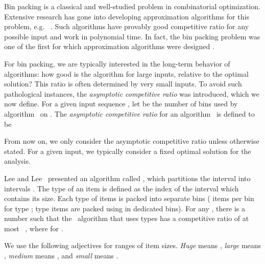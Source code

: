 Bin packing is a classical and well-studied problem in combinatorial optimization. 
Extensive research has gone into developing approximation
algorithms for this problem, e.g. ~\cite{CoGaJo97,GaGrUl72,FerLue81,KarKar82,Rothvoss13,GoeRot14}. Such algorithms have provably good competitive ratio for any possible
input and work in polynomial time. In fact, the bin packing problem was one 
of the first for which approximation algorithms were designed \cite{Johnso73}. 

For bin packing, we are typically interested in the long-term behavior of
algorithms: how good is the algorithm for large inputs, relative to the optimal solution? 
This ratio is often determined by very small inputs. 
To avoid such pathological
instances, the {\em asymptotic competitive ratio} was introduced,
which we now define. For a given input sequence ,
let  be the number of bins used by algorithm~ on .
The {\em asymptotic competitive ratio} for an algorithm~ is defined to be

From now on, we only consider the asymptotic competitive ratio unless otherwise stated. 
For a given input, we typically consider a fixed optimal solution for the analysis.

Lee and Lee~\cite{LeeLee85} presented an algorithm called \harm, 
which partitions the interval
 into  intervals .
The type of an item is defined as the index of the interval which contains its size.
Each type of items is packed into separate bins ( items per bin for type ; type  items are packed
using {\nf} in dedicated bins).
For any , there is a number  such that the \harm\ algorithm
that uses  types has a competitive ratio of at most
~\cite{LeeLee85}, where  for .

\iffalse 
{\SuperH} algorithms classify items based on an interval partition of  and give each item a color as it arrives, red or blue.
For each type , the fraction of red items is some constant denoted by . 
Blue items are packed as in \harm, i.e., for each item type , every bin with blue
items contains a maximal number of blue items. (This may leave some space for
smaller red items of different types.) Red items are packed in bins which
are only partially filled. The idea is that hopefully, later blue items
of other types will arrive that can be placed into the bins with red items. \fi 

\begin{definition}
\label{def:1}
We use the following adjectives for ranges of item sizes.
\emph{Huge} means , \emph{large} means , \emph{medium} means , and \emph{small} means .
\end{definition}

